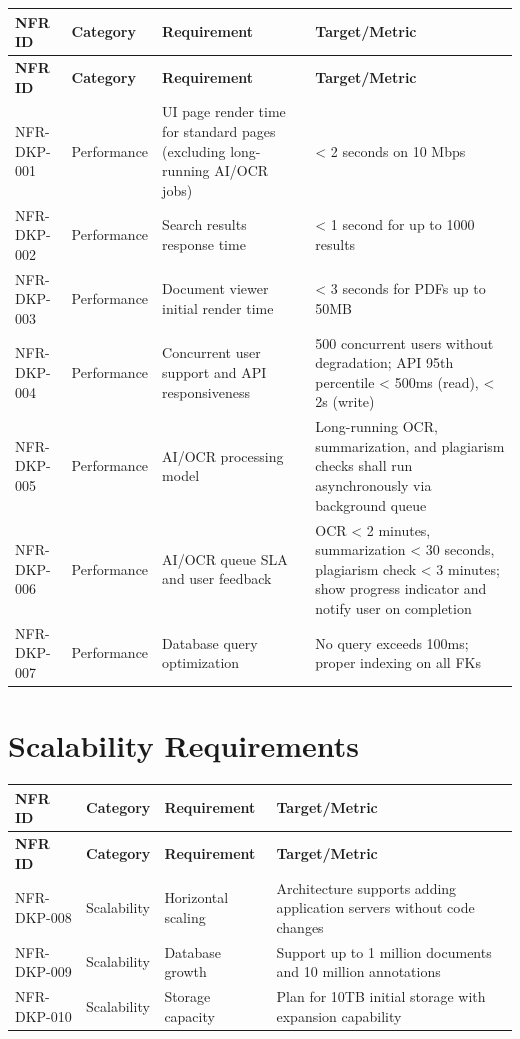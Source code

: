 \documentclass[12pt,a4paper]{report}
\begin{document}
\begin{longtable}{|p{2cm}|p{3cm}|p{5.5cm}|p{3.5cm}|}
\hline
\textbf{NFR ID} & \textbf{Category} & \textbf{Requirement} & \textbf{Target/Metric} \\ \hline
\endfirsthead
\hline
\textbf{NFR ID} & \textbf{Category} & \textbf{Requirement} & \textbf{Target/Metric} \\ \hline
\endhead
NFR-DKP-001 & Performance & UI page render time for standard pages (excluding long-running AI/OCR jobs) & < 2 seconds on 10 Mbps \\ \hline
NFR-DKP-002 & Performance & Search results response time & < 1 second for up to 1000 results \\ \hline
NFR-DKP-003 & Performance & Document viewer initial render time & < 3 seconds for PDFs up to 50MB \\ \hline
NFR-DKP-004 & Performance & Concurrent user support and API responsiveness & 500 concurrent users without degradation; API 95th percentile < 500ms (read), < 2s (write) \\ \hline
NFR-DKP-005 & Performance & AI/OCR processing model & Long-running OCR, summarization, and plagiarism checks shall run asynchronously via background queue \\ \hline
NFR-DKP-006 & Performance & AI/OCR queue SLA and user feedback & OCR < 2 minutes, summarization < 30 seconds, plagiarism check < 3 minutes; show progress indicator and notify user on completion \\ \hline
NFR-DKP-007 & Performance & Database query optimization & No query exceeds 100ms; proper indexing on all FKs \\ \hline
\end{longtable}

\section{Scalability Requirements}

\begin{longtable}{|p{2cm}|p{3cm}|p{5.5cm}|p{3.5cm}|}
\hline
\textbf{NFR ID} & \textbf{Category} & \textbf{Requirement} & \textbf{Target/Metric} \\ \hline
\endfirsthead
\hline
\textbf{NFR ID} & \textbf{Category} & \textbf{Requirement} & \textbf{Target/Metric} \\ \hline
\endhead
NFR-DKP-008 & Scalability & Horizontal scaling & Architecture supports adding application servers without code changes \\ \hline
NFR-DKP-009 & Scalability & Database growth & Support up to 1 million documents and 10 million annotations \\ \hline
NFR-DKP-010 & Scalability & Storage capacity & Plan for 10TB initial storage with expansion capability \\ \hline
\end{longtable}
\end{document}
